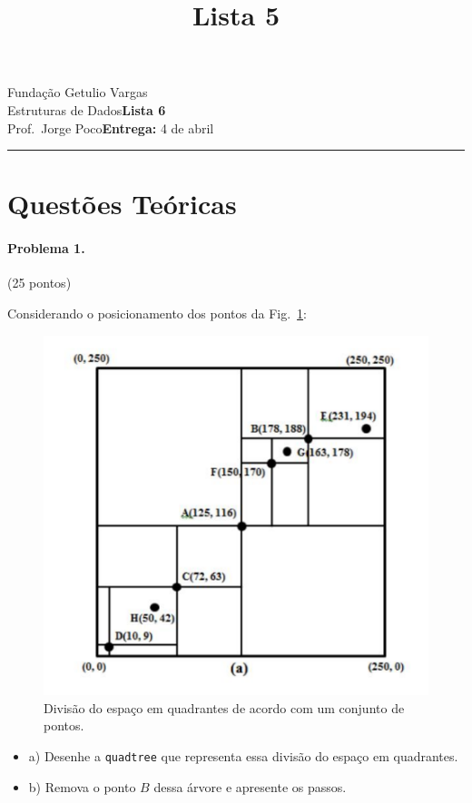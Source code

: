 \documentclass{article}
\title{Lista 5}
\date{}
\newcommand{\assignment}{Lista 6}
\newcommand{\duedate}{4 de abril}
\begin{document}
Fundação Getulio Vargas\hfill\\
Estruturas de Dados\hfill\textbf{\assignment}\\
Prof.\ Jorge Poco\hfill\textbf{Entrega:} \duedate\\
\smallskip\hrule\bigskip

{\let\newpage\relax\maketitle}
\maketitle

\section{Questões Teóricas}

\paragraph{Problema 1.} (25 pontos)

Considerando o posicionamento dos pontos da Fig.~\ref{fig:prob1}:

\begin{figure}[h]
    \centering
    \includegraphics[width = 0.5\linewidth]{figs/fig1.png}
    \caption{Divisão do espaço em quadrantes de acordo com um conjunto de pontos.}
    \label{fig:prob1}
\end{figure}

\begin{itemize}
    \item a) Desenhe a \texttt{quadtree} que representa essa divisão do espaço em quadrantes.
    \item b) Remova o ponto $B$ dessa árvore e apresente os passos.
\end{itemize}
\end{document}
